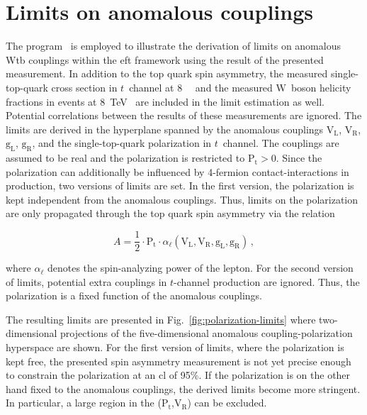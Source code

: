 \section{Limits on anomalous couplings}

The \TOPFIT[format=hyperbf] program~\cite{AguilarSaavedra:2010nx,topfit} is employed to illustrate the derivation of limits on anomalous Wtb couplings within the \gls{eft} framework using the result of the presented measurement. In addition to the top quark spin asymmetry, the measured single-top-quark cross section in $t$~channel at 8~\TeV~\cite{Khachatryan:2014iya} and the measured W~boson helicity fractions in \ttbar events at 8~TeV~\cite{Khachatryan:2016fky} are included in the limit estimation as well. Potential correlations between the results of these measurements are ignored. The limits are derived in the hyperplane spanned by the anomalous couplings $\mathrm{V}_\mathrm{L}$, $\mathrm{V}_\mathrm{R}$, $\mathrm{g}_\mathrm{L}$, $\mathrm{g}_\mathrm{R}$, and the single-top-quark polarization in $t$~channel. The couplings are assumed to be real and the polarization is restricted to $\mathrm{P}_\mathrm{t}>0$. Since the polarization can additionally be influenced by 4-fermion contact-interactions in production, two versions of limits are set. In the first version, the polarization is kept independent from the anomalous couplings. Thus, limits on the polarization are only propagated through the top quark spin asymmetry via the relation

\begin{equation}
A=\frac{1}{2}\cdot\mathrm{P}_\mathrm{t}\cdot\alpha_{\ell}(\mathrm{V}_\mathrm{L},\mathrm{V}_\mathrm{R},\mathrm{g}_\mathrm{L},\mathrm{g}_\mathrm{R})\,,
\end{equation}

where $\alpha_{\ell}$ denotes the spin-analyzing power of the lepton. For the second version of limits, potential extra couplings in $t$-channel production are ignored. Thus, the polarization is a fixed function of the anomalous couplings. 

The resulting limits are presented in Fig.~\ref{fig:polarization-limits} where two-dimensional projections of the five-dimensional anomalous coupling-polarization hyperspace are shown. For the first version of limits, where the polarization is kept free, the presented spin asymmetry measurement is not yet precise enough to constrain the polarization at an \acrfull{cl} of 95\%. If the polarization is on the other hand fixed to the anomalous couplings, the derived limits become more stringent. In particular, a large region in the ($\mathrm{P}_\mathrm{t}$,$\mathrm{V}_\mathrm{R}$) can be excluded.

